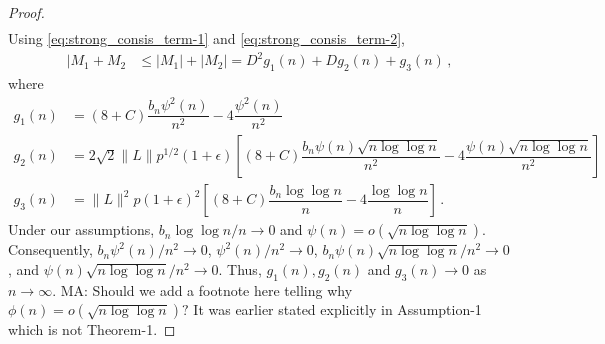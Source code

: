 \documentclass[11pt]{article}
\newtheorem{lemma}{Lemma}
\theoremstyle{remark}
\begin{document}
\begin{proof}
\begin{align*}
\end{align*}
%
%
%
%
Using \eqref{eq:strong_consis_term-1} and \eqref{eq:strong_consis_term-2},
\begin{align*}
|M_1 + M_2  & \leq |M_1| + |M_2|
   = D^2g_1(n) + D g_2(n) + g_3(n)\,,
\end{align*}
where
\begin{align*}
    g_1(n) &= (8 + C)\dfrac{b_n \psi^2(n)}{n^2} - 4\dfrac{\psi^2(n)}{n^2}\\
    g_2(n) &= 2\sqrt{2}\|L\|p^{1/2}(1+\epsilon)\left[(8 + C)\dfrac{b_n\psi(n)\sqrt{n\log \log n}}{n^2} - 4\dfrac{\psi(n)\sqrt{n\log \log n}}{n^2}\right]\\
    g_3(n) &= \|L\|^2 p (1+\epsilon)^2\left[(8 + C)\dfrac{b_n \log\log n}{n} - 4 \dfrac{\log \log n}{n}\right]\,.
\end{align*}
Under our assumptions, 
$b_n\log \log n /n \to 0$ and $\psi(n) = o(\sqrt{n \log \log n})$. Consequently, 
$b_n \psi^2(n)/n^2 \to 0$, $\psi^2(n)/n^2 \to 0$, ${b_n\psi(n)\sqrt{n\log \log n}/n^2} \to 0$, and $\psi(n) \sqrt{n \log \log n}/n^2 \to 0$. Thus, $g_1(n), g_2(n)$ and $g_3(n) \to 0$ as $n \to \infty$. {\color{orange} MA: Should we add a footnote here telling why $\phi(n)=o(\sqrt{n \log \log n})?$ It was earlier stated explicitly in Assumption-1 which is not Theorem-1.}

\end{proof}
\end{document}
